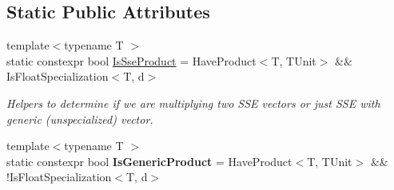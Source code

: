 \subsection*{Static Public Attributes}
\begin{DoxyCompactItemize}
\item 
\hypertarget{classVector_3_01TUnit_00_01d_00_01std_1_1enable__if__t_3_01IsFloatSpecialization_3_01TUnit_00_01d_01_4_01_4_01_4_a4f11b5b2751ae0cab2d0925a2a99edce}{}\label{classVector_3_01TUnit_00_01d_00_01std_1_1enable__if__t_3_01IsFloatSpecialization_3_01TUnit_00_01d_01_4_01_4_01_4_a4f11b5b2751ae0cab2d0925a2a99edce} 
{\footnotesize template$<$typename T $>$ }\\static constexpr bool \hyperlink{classVector_3_01TUnit_00_01d_00_01std_1_1enable__if__t_3_01IsFloatSpecialization_3_01TUnit_00_01d_01_4_01_4_01_4_a4f11b5b2751ae0cab2d0925a2a99edce}{Is\+Sse\+Product} = Have\+Product$<$T, T\+Unit$>$ \&\& Is\+Float\+Specialization$<$T, d$>$
\begin{DoxyCompactList}\small\item\em Helpers to determine if we are multiplying two S\+SE vectors or just S\+SE with generic (unspecialized) vector. \end{DoxyCompactList}\item 
\hypertarget{classVector_3_01TUnit_00_01d_00_01std_1_1enable__if__t_3_01IsFloatSpecialization_3_01TUnit_00_01d_01_4_01_4_01_4_a11e99d66aaf16e293c36509866edc9ee}{}\label{classVector_3_01TUnit_00_01d_00_01std_1_1enable__if__t_3_01IsFloatSpecialization_3_01TUnit_00_01d_01_4_01_4_01_4_a11e99d66aaf16e293c36509866edc9ee} 
{\footnotesize template$<$typename T $>$ }\\static constexpr bool {\bfseries Is\+Generic\+Product} = Have\+Product$<$T, T\+Unit$>$ \&\& !Is\+Float\+Specialization$<$T, d$>$
\end{DoxyCompactItemize}

